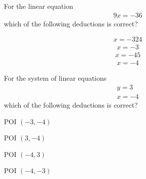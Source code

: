 \documentclass{webquiz}
\begin{document}
\begin{question} %
For the linear equation
\begin{gather*} 
9x=-36
\end{gather*}
which of the following deductions is correct?
\begin{choice}[columns=1] %
\incorrect
\begin{gather*} 
x=-324
\end{gather*}
\incorrect
\begin{gather*} 
x=-3
\end{gather*}
\incorrect
\begin{gather*} 
x=-45
\end{gather*}
\correct
\begin{gather*} 
x=-4
\end{gather*}
\end{choice}
\end{question}



\begin{question} %
For the system of linear equations
\begin{gather*}
y=3\\
x=-4
\end{gather*}
which of the following deductions is correct?
\begin{choice}[columns=1] %
\incorrect POI $(-3,-4)$

\incorrect POI $(3,-4)$

\correct POI $(-4,3)$

\incorrect POI $(-4,-3)$
\end{choice}
\end{question}
\end{document}
